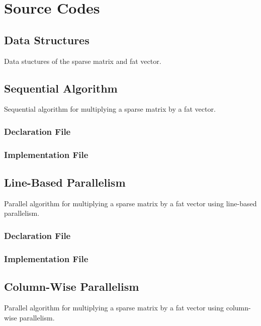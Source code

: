 \documentclass[12pt,oneside]{book} %
\begin{document}
\chapter{Source Codes}
\begin{subappendices}
    \section{Data Structures}\label{appendix:data-structures}
    Data stuctures of the sparse matrix and fat vector.
    

    \newpage
    \section{Sequential Algorithm}\label{appendix:sequential}
    Sequential algorithm for multiplying a sparse matrix by a fat vector.
    \subsection{Declaration File}
    
    \subsection{Implementation File}
    

    \section{Line-Based Parallelism}\label{appendix:line-based}
    Parallel algorithm for multiplying a sparse matrix by a fat vector using
    line-based parallelism.
    \subsection{Declaration File}
    
    \subsection{Implementation File}
    

    \section{Column-Wise Parallelism}\label{appendix:column-based}
    Parallel algorithm for multiplying a sparse matrix by a fat vector using
    column-wise parallelism.

\end{subappendices}
\end{document}
